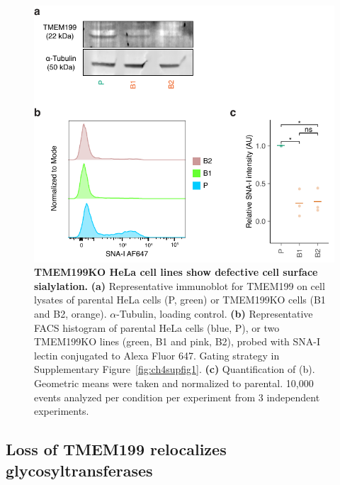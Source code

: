\begin{figure}
    \includegraphics[keepaspectratio=true]{chapters/chapter4/chapter4_Figure1.pdf}
    \caption{\textbf{TMEM199KO HeLa cell lines show defective cell surface sialylation.} \textbf{(a)} Representative immunoblot for TMEM199 on cell lysates of parental HeLa cells (P, green) or TMEM199KO cells (B1 and B2, orange). $\alpha$-Tubulin, loading control. \textbf{(b)} Representative FACS histogram of parental HeLa cells (blue, P), or two TMEM199KO lines (green, B1 and pink, B2), probed with SNA-I lectin conjugated to Alexa Fluor 647. Gating strategy in Supplementary Figure~\ref{fig:ch4supfig1}. \textbf{(c)} Quantification of (b). Geometric means were taken and normalized to parental. 10,000 events analyzed per condition per experiment from 3 independent experiments.}
    \label{fig:ch4fig1}
\end{figure}

\subsection{Loss of TMEM199 relocalizes glycosyltransferases}

